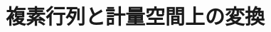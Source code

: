 \documentclass[../../topic_linear-algebra]{subfiles}
\begin{document}
\chapter{複素行列と計量空間上の変換}



\end{document}
